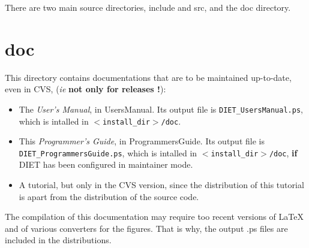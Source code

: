 

There are two main source directories, \textsf{include} and \textsf{src}, and
the \textsf{doc} directory.


\section{\textsf{doc}}
\label{s:doc}

This directory contains documentations that are to be maintained up-to-date,
even in CVS, (\emph{ie} \textbf{not only for releases !}):

\begin{itemize}
\item The \textit{User's Manual}, in \textsf{UsersManual}. Its output file is
  \texttt{DIET\_UsersManual.ps}, which is intalled in
  \texttt{$<$install\_dir$>$/doc}.
\item This \textit{Programmer's Guide}, in \textsf{ProgrammersGuide}. Its output
  file is \texttt{DIET\_ProgrammersGuide.ps}, which is intalled in
  \texttt{$<$install\_dir$>$/doc}, \textbf{if} DIET has been configured in
  maintainer mode.
\item A tutorial, but only in the CVS version, since the distribution of this
  tutorial is apart from the distribution of the source code.
\end{itemize}

The compilation of this documentation may require too recent versions of \LaTeX
and of various converters for the figures. That is why, the output \textsf{.ps}
files are included in the distributions.


